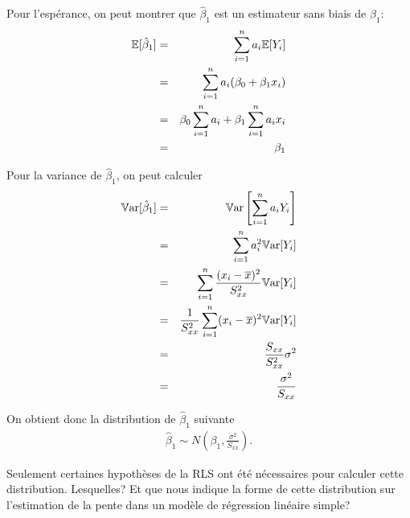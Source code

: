 Pour l'espérance, on peut montrer que $\hat{\beta}_1$ est un estimateur sans biais de $\beta_1$:
\begin{eqnarray*}
 \mathbb{E}[\hat{\beta}_1] &=& \sum_{i=1}^n a_i \mathbb{E}[Y_i] \\
 &=& \sum_{i=1}^n a_i (\beta_0 + \beta_1 x_i)\\
 &=& \beta_0 \sum_{i=1}^n a_i + \beta_1 \sum_{i=1}^n a_i x_i\\
 &=& \beta_1
\end{eqnarray*}


Pour la variance de $\hat\beta_1$, on peut calculer
\begin{eqnarray*}
 \mathbb{V}\text{ar}[\hat\beta_1]&=&\mathbb{V}\text{ar}\left[\sum_{i=1}^n a_i Y_i\right]\\
 &=& \sum_{i=1}^n a_i ^2 \mathbb{V}\text{ar}[Y_i]\\
 &=& \sum_{i=1}^n \frac{(x_i-\overline{x})^2}{S_{xx}^2} \mathbb{V}\text{ar}[Y_i]\\
 &=& \frac{1}{S^2_{xx}} \sum_{i=1}^n (x_i-\overline{x})^2 \mathbb{V}\text{ar}[Y_i]\\
 &=& \frac{S_{xx}}{S_{xx}^2} \sigma^2 \\
 &=& \frac{\sigma^2}{S_{xx}}
\end{eqnarray*}

On obtient donc la distribution de $\hat\beta_1$ suivante
\begin{eqnarray}
\label{distbeta1}
 \hat{\beta}_1 \sim N\left( \beta_1, \frac{\sigma^2}{S_{xx}} \right).
 \label{loibeta1}
\end{eqnarray}

\vspace{0.1in}
\begin{remarque}
Seulement certaines hypothèses de la RLS ont été nécessaires pour calculer cette distribution. Lesquelles? Et que nous indique la forme de cette distribution sur l'estimation de la pente dans un modèle de régression linéaire simple?
\end{remarque}


